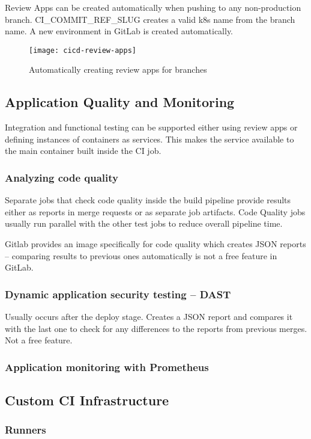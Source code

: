 Review Apps can be created automatically when pushing to any non-production branch. CI\_COMMIT\_REF\_SLUG creates a valid k8s name from the branch name. 
A new environment in GitLab is created automatically.

\begin{figure}[h]
    \centering
    \texttt{[image: cicd-review-apps]}
    \caption{Automatically creating review apps for branches}
\end{figure}

\subsection{Application Quality and Monitoring}
Integration and functional testing can be supported either using review apps or defining instances of containers as services. This makes the service available to the 
main container built inside the CI job.

\subsubsection{Analyzing code quality}
Separate jobs that check code quality inside the build pipeline provide results either as reports in merge requests or as separate job artifacts.
Code Quality jobs usually run parallel with the other test jobs to reduce overall pipeline time. 

Gitlab provides an image specifically for code quality which creates JSON reports -- comparing results to previous ones automatically is not a free feature in GitLab.

\subsubsection{Dynamic application security testing -- DAST}
Usually occurs after the deploy stage. Creates a JSON report and compares it with the last one to check for any differences to the reports from previous merges. Not a free feature.

\subsubsection{Application monitoring with Prometheus}



\subsection{Custom CI Infrastructure}

\subsubsection{Runners}